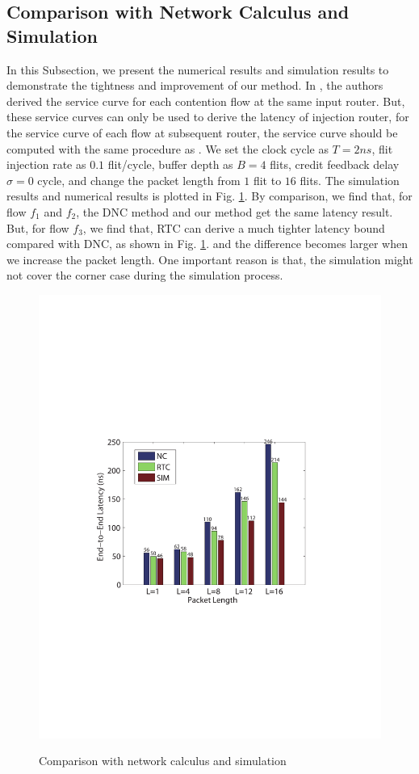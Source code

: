 \documentclass[10pt,journal]{IEEEtran}
\begin{document}
\subsection{Comparison with Network Calculus and Simulation}
In this Subsection, we present the numerical results and simulation results to demonstrate the tightness and improvement of our method. In \cite{Qian489900}, the authors derived the service curve for each contention flow at the same input router. But, these service curves can only be used to derive the latency of injection router, for the service curve of each flow at subsequent router, the service curve should be computed with the same procedure as \cite{qian2009analysis}. We set the clock cycle as $T=2ns$, flit injection rate as $0.1$ flit/cycle, buffer depth as $B=4$ flits, credit feedback delay $\sigma=0$ cycle, and change the packet length from $1$ flit to $16$ flits. The simulation results and numerical results is plotted in Fig. \ref{comparison}. By comparison, we find that, for flow $f_1$ and $f_2$, the DNC method and our method get the same latency result. But, for flow $f_3$, we find that, RTC can derive a much tighter latency bound compared with DNC, as shown in Fig. \ref{comparison}. and the difference becomes larger when we increase the packet length. One important reason is that, the simulation might not cover the corner case during the simulation process.
\begin{figure}
  \centering
  \includegraphics[scale=0.6]{figures/comparison.pdf}\\
  \caption{Comparison with network calculus and simulation}\label{comparison}
\end{figure}
\end{document}
